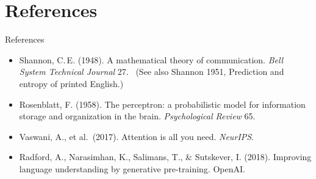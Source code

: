 \documentclass[aspectratio=169,11pt]{beamer}
\begin{document}
\section{References}
\begin{frame}[t]{References}
\small
\begin{itemize}\setlength{\itemsep}{4pt}
\item Shannon, C.\,E. (1948). A mathematical theory of communication. \emph{Bell System Technical Journal} 27. \ (See also Shannon 1951, Prediction and entropy of printed English.)
\item Rosenblatt, F. (1958). The perceptron: a probabilistic model for information storage and organization in the brain. \emph{Psychological Review} 65.
\item Vaswani, A., et al.\ (2017). Attention is all you need. \emph{NeurIPS}.
\item Radford, A., Narasimhan, K., Salimans, T., \& Sutskever, I. (2018). Improving language understanding by generative pre-training. OpenAI.
\end{itemize}
\end{frame}
\end{document}
